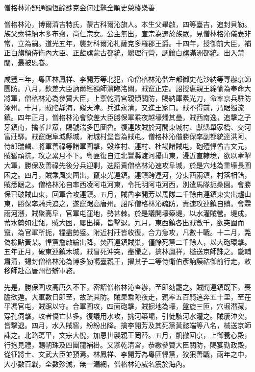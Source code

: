 
\begin{pinyinscope}
僧格林沁舒通額恆齡蘇克金何建鼇全順史榮椿樂善

僧格林沁，博爾濟吉特氏，蒙古科爾沁旗人。本生父畢啟，四等臺吉，追封貝勒。族父索特納木多布齋，尚仁宗女。公主無出，宣宗為選於族眾，見僧林格沁儀表非常，立為嗣。道光五年，襲封科爾沁札薩克多羅郡王爵。十四年，授御前大臣，補正白旗領侍衛內大臣、正藍旗蒙古都統，總理行營，調鑲白旗滿洲都統。出入禁闈，最被恩眷。

咸豐三年，粵匪林鳳祥、李開芳等北犯，命僧格林沁偕左都御史花沙納等專辦京師團防。八月，欽差大臣訥爾經額師潰臨洺關，賊竄正定。詔授惠親王綿愉為奉命大將軍，僧格林沁為參贊大臣，上禦乾清宮親頒關防，賜納庫素光刀，命率京兵駐防涿州。十月，賊陷靜海，窺天津。兵進永清，又進王家口。賊不得前，乃踞獨流鎮。四年正月，僧格林沁會欽差大臣勝保軍乘夜越壕燔其壘，賊西南逸，追擊之子牙鎮南，擒斬甚眾，賜號湍多巴圖魯。復連敗賊於河間束城村、獻縣單家橋、交河富莊驛。賊竄踞阜城縣城，附城村堡皆為賊屯。僧格林沁偕勝保率副都統達洪阿、侍郎瑞麟、將軍善祿等諸軍圍擊，毀堆村、連村、杜場諸賊屯，砲殪悍酋吉文元，賊猶頑抗，攻之累月不下。粵匪復自江北豐縣渡河擾山東，浸近直隸境，欲以牽掣大軍，勝保及善祿先後分兵迎剿，迭詔責僧格林沁速攻阜城，於是穴地為重壕長圍困之。四月，賊乘風突圍出，竄東光連鎮。連鎮跨運河，分東西兩鎮，村落相錯，賊悉踞之。僧格林沁自率西凌阿屯河東，令托明阿屯河西，別遣馬隊扼桑園。會勝保已破賊山東，回軍合攻連鎮。五月，賊酋李開芳以馬隊二千餘由連鎮東突出趨山東，勝保率騎兵追之，遂竄踞高唐州。詔斥僧格林沁疏防，責速攻連鎮自贖。會霖雨河漲，賊聚高阜，官軍屯窪地，勢甚棘。於是議開壕築堤，以水灌賊營。堤成，蓄水勢如建瓴，賊大困，屢出撲，皆擊退。九月，東西鎮各出賊數千，欲突圍而竄，為官軍所扼，糧盡勢蹙。附近村莊皆收復，合力急攻，凡數十戰。十二月，斃偽檢點黃某。悍黨詹啟綸出降，焚西連鎮賊巢，僅餘死黨二千餘人，以大砲環擊。五年正月，破東連鎮木城，賊冒死沖突，盡殲之，擒林鳳祥，檻送京師誅之。畿輔肅清，錫封僧格林沁為博多勒噶臺親王，擢其子二等侍衛伯彥訥謨祜御前行走，敕移師赴高唐州督辦軍務。

先是，勝保圍攻高唐久不下，密詔僧格林沁查辦，至即劾罷之。賊聞連鎮既下，喪膽欲遁。大軍數日即至，故疏其防。賊果乘隙夜走，親率五百騎追奔五十里，至茌平馮官屯，賊踞以守。合軍圍攻，四面砲擊，賊掘地為壕，盤旋三匝，穴堀潛藏，穿孔伺擊，攻者傷亡甚多。復議用水攻，挑河築壩，引徒駭河水灌之。賊屢沖突，皆擊退。四月，水入賊窖，紛紛出降。擒李開芳及其死黨黃懿端等八名，械送京師誅之。北路蕩平，文宗大悅，加恩世襲親王罔替。五月，凱撤回京，上御養心殿，行抱見禮，賜朝珠及四團龍補褂。又禦乾清宮，恭繳參贊大臣關防，賜宴勤政殿，從征將士、文武大臣並預焉。林鳳祥、李開芳為粵匪悍黨，狡狠善戰，兩年之中，大小數百戰，全數殄滅，無一漏網，僧格林沁威名震於海內。


\end{pinyinscope}
